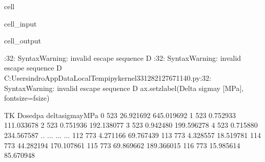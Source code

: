 \documentclass[letterpaper,10pt,english]{jupyterBook}
\begin{document}
\begin{sphinxuseclass}{cell}
\begin{sphinxVerbatimInput}
\begin{sphinxuseclass}{cell_input}
\begin{sphinxVerbatim}[commandchars=\\\{\}]
					 
					 
					 
					 
				\end{sphinxVerbatim}
				
		\end{sphinxuseclass}\end{sphinxVerbatimInput}
		\begin{sphinxVerbatimOutput}
			
			\begin{sphinxuseclass}{cell_output}
				\begin{sphinxVerbatim}[commandchars=\\\{\}]
					\PYGZlt{}\PYGZgt{}:32: SyntaxWarning: invalid escape sequence \PYGZsq{}\PYGZbs{}D\PYGZsq{}
					\PYGZlt{}\PYGZgt{}:32: SyntaxWarning: invalid escape sequence \PYGZsq{}\PYGZbs{}D\PYGZsq{}
					C:\PYGZbs{}Users\PYGZbs{}indro\PYGZbs{}AppData\PYGZbs{}Local\PYGZbs{}Temp\PYGZbs{}ipykernel\PYGZus{}33128\PYGZbs{}2127671140.py:32: SyntaxWarning: invalid escape sequence \PYGZsq{}\PYGZbs{}D\PYGZsq{}
					ax.set\PYGZus{}zlabel(\PYGZsq{}\PYGZdl{}\PYGZbs{}Delta \PYGZbs{}sigma\PYGZus{}y\PYGZdl{} [MPa]\PYGZsq{}, fontsize=f\PYGZus{}size)
				\end{sphinxVerbatim}
				
				\begin{sphinxVerbatim}[commandchars=\\\{\}]
					TK    Dosedpa  delta\PYGZus{}sigma\PYGZus{}yMPa
					0    523  26.921692        645.019692
					1    523   0.752933        111.033678
					2    523   0.751936        192.138077
					3    523   0.942480        199.596278
					4    523   0.715880        234.567587
					..   ...        ...               ...
					112  773   4.271166        \PYGZhy{}69.767439
					113  773   4.328557        \PYGZhy{}18.519781
					114  773  44.282194       \PYGZhy{}170.107861
					115  773  69.869662       \PYGZhy{}189.366015
					116  773  15.985614        \PYGZhy{}85.670948
					

\end{sphinxVerbatim}
\end{sphinxuseclass}
\end{sphinxVerbatimOutput}
\end{sphinxuseclass}
\end{document}
